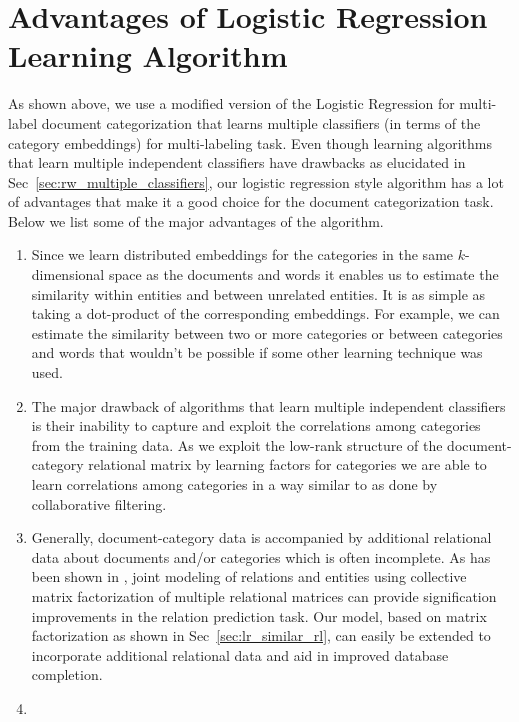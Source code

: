 \section{Advantages of Logistic Regression Learning Algorithm}
As shown above, we use a modified version of the Logistic Regression for multi-label document categorization that learns multiple classifiers (in terms of the category embeddings) for multi-labeling task. Even though learning algorithms that learn multiple independent classifiers have drawbacks as elucidated in Sec~\ref{sec:rw_multiple_classifiers}, our logistic regression style algorithm has a lot of advantages that make it a good choice for the document categorization task. Below we list some of the major advantages of the algorithm. 
\begin{enumerate}
\item 
Since we learn distributed embeddings for the categories in the same $k$-dimensional space as the documents and words it enables us to estimate the similarity within entities and between unrelated entities. It is as simple as taking a dot-product of the corresponding embeddings. For example, we can estimate the similarity between two or more categories or between categories and words that wouldn't be possible if some other learning technique was used. 

\item 
The major drawback of algorithms that learn multiple independent classifiers is their inability to capture and exploit the correlations among categories from the training data. As we exploit the low-rank structure of the document-category relational matrix by learning factors for categories we are able to learn correlations among categories in a way similar to as done by collaborative filtering.

\item 
Generally, document-category data is accompanied by additional relational data about documents and/or categories which is often incomplete. As has been shown in , joint modeling of relations and entities using collective matrix factorization of multiple relational matrices can provide signification improvements in the relation prediction task. 
Our model, based on matrix factorization as shown in Sec~\ref{sec:lr_similar_rl}, can easily be extended to incorporate additional relational data and aid in improved database completion. 

\item {}
\end{enumerate}